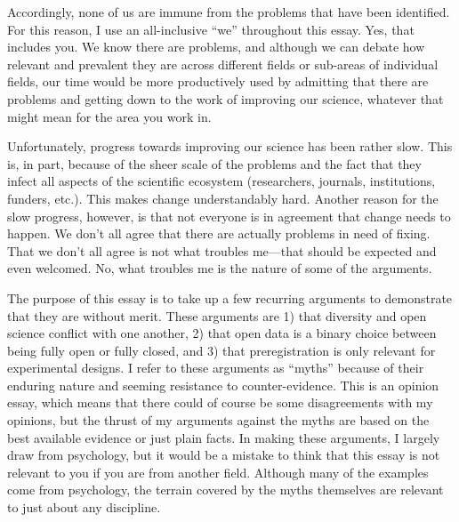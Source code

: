 \documentclass[authordate, empirical]{jote-new-article}
\begin{document}
Accordingly, none of us are immune from the problems that have been identified. For this reason, I use an all-inclusive “we” throughout this essay. Yes, that includes you. We know there are problems, and although we can debate how relevant and prevalent they are across different fields or sub-areas of individual fields, our time would be more productively used by admitting that there are problems and getting down to the work of improving our science, whatever that might mean for the area you work in.







Unfortunately, progress towards improving our science has been rather slow. This is, in part, because of the sheer scale of the problems and the fact that they infect all aspects of the scientific ecosystem (researchers, journals, institutions, funders, etc.). This makes change understandably hard. Another reason for the slow progress, however, is that not everyone is in agreement that change needs to happen. We don't all agree that there are actually problems in need of fixing. That we don't all agree is not what troubles me—that should be expected and even welcomed. No, what troubles me is the nature of some of the arguments.







The purpose of this essay is to take up a few recurring arguments to demonstrate that they are without merit. These arguments are 1) that diversity and open science conflict with one another, 2) that open data is a binary choice between being fully open or fully closed, and 3) that preregistration is only relevant for experimental designs. I refer to these arguments as “myths” because of their enduring nature and seeming resistance to counter-evidence. This is an opinion essay, which means that there could of course be some disagreements with my opinions, but the thrust of my arguments against the myths are based on the best available evidence or just plain facts. In making these arguments, I largely draw from psychology, but it would be a mistake to think that this essay is not relevant to you if you are from another field. Although many of the examples come from psychology, the terrain covered by the myths themselves are relevant to just about any discipline.
\end{document}
